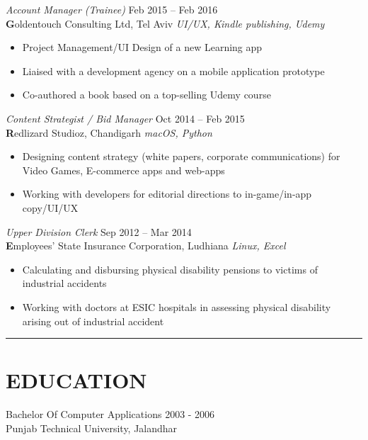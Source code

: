 \documentclass[margin, 10pt]{res} %
\begin{document}
\begin{resume}
{\sl Account Manager (Trainee)} \hfill Feb 2015 – Feb 2016 \\
\textbf Goldentouch Consulting Ltd, Tel Aviv \hfill {\scriptsize \it UI/UX, Kindle publishing, Udemy} 
\begin{itemize}\smallskip\smallskip
\item Project Management/UI Design of a new Learning app
\item Liaised with a development agency on a mobile application prototype
\item Co-authored a book based on a top-selling Udemy course
\end{itemize}

{\sl Content Strategist / Bid Manager} \hfill Oct 2014 – Feb 2015 \\
\textbf Redlizard Studioz, Chandigarh \hfill {\scriptsize \it macOS, Python}
\begin{itemize}\smallskip\smallskip
\item Designing content strategy (white papers, corporate communications) for Video Games, E-commerce apps and web-apps
\item Working with developers for editorial directions to in-game/in-app copy/UI/UX
\end{itemize}

{\sl Upper Division Clerk} \hfill Sep 2012 – Mar 2014 \\
\textbf Employees' State Insurance Corporation, Ludhiana \hfill {\scriptsize \it Linux, Excel}
\begin{itemize}\smallskip\smallskip
\item Calculating and disbursing physical disability pensions to victims of industrial accidents
\item Working with doctors at ESIC hospitals in assessing physical disability arising out of industrial accident 
\end{itemize} 

\par\noindent\rule{\textwidth}{0.1pt}

\section{\ttfamily EDUCATION}
Bachelor Of Computer Applications \hfill 2003 - 2006 \\
Punjab Technical University, Jalandhar 

\end{resume}
\end{document}
